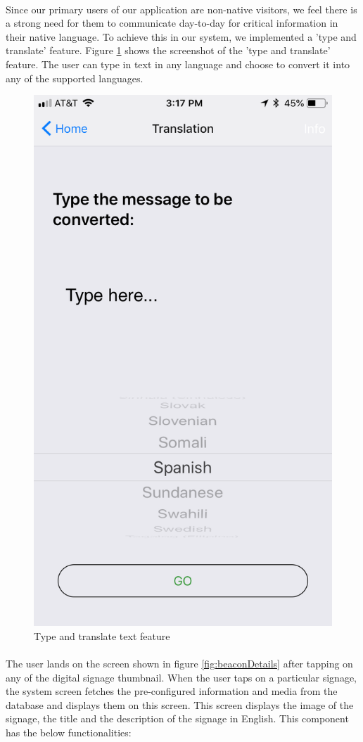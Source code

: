 \documentclass[12pt]{article}
\begin{document}
\paragraph{} Since our primary users of our application are non-native visitors, we feel there is a strong need for them to communicate day-to-day for critical information in their native language. To achieve this in our system, we implemented a 'type and translate' feature. Figure \ref{fig:type} shows the screenshot of the 'type and translate' feature. The user can type in text in any language and choose to convert it into any of the supported languages. 
\begin{figure}[H]
	\centering
	\includegraphics[width=0.5\linewidth]{media/5.PNG}
	\caption{Type and translate text feature}
	\label{fig:type}
\end{figure} 

\paragraph{} The user lands on the screen shown in figure \ref{fig:beaconDetails} after tapping on any of the digital signage thumbnail. When the user taps on a particular signage, the system screen fetches the pre-configured information and media from the database and displays them on this screen. This screen displays the image of the signage, the title and the description of the signage in English. This component  has the below functionalities:
\end{document}
